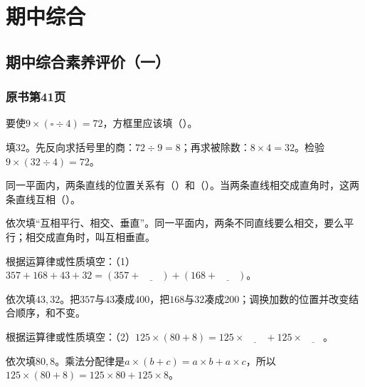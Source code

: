\chapter{期中综合}


\section{期中综合素养评价（一）}



\subsection*{原书第41页}

要使\(9\times(\square\div4)=72\)，方框里应该填（\hspace{1.8em}）。\par
\begin{BookAnswer}
填\(32\)。先反向求括号里的商：\(72\div9=8\)；再求被除数：\(8\times4=32\)。检验\(9\times(32\div4)=72\)。
\end{BookAnswer}

同一平面内，两条直线的位置关系有（\hspace{1.8em}）和（\hspace{1.8em}）。当两条直线相交成直角时，这两条直线互相（\hspace{1.8em}）。\par
\begin{BookAnswer}
依次填“互相平行、相交、垂直”。同一平面内，两条不同直线要么相交，要么平行；相交成直角时，叫互相垂直。
\end{BookAnswer}

根据运算律或性质填空：（1）\(357+168+43+32=(357+\underline{\qquad})+(168+\underline{\qquad})\)。\par
\begin{BookAnswer}
依次填\(43,32\)。把\(357\)与\(43\)凑成400，把\(168\)与\(32\)凑成200；调换加数的位置并改变结合顺序，和不变。
\end{BookAnswer}

根据运算律或性质填空：（2）\(125\times(80+8)=125\times\underline{\qquad}+125\times\underline{\qquad}\)。\par
\begin{BookAnswer}
依次填\(80,8\)。乘法分配律是\(a\times(b+c)=a\times b+a\times c\)，所以\(125\times(80+8)=125\times80+125\times8\)。
\end{BookAnswer}

